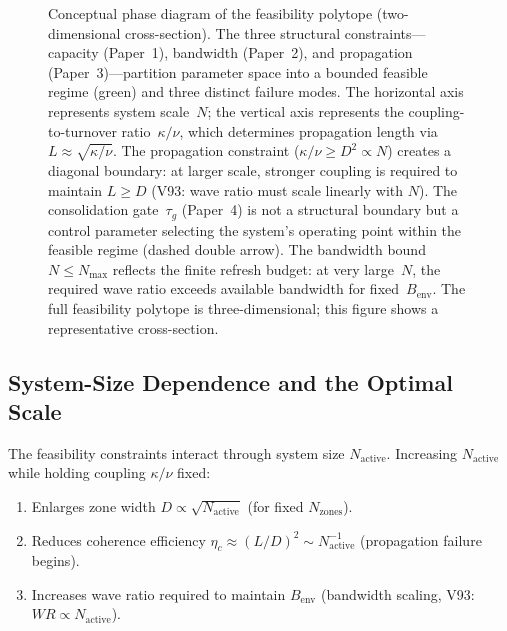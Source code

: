 \documentclass[11pt]{article}
\begin{document}
\begin{figure}[htbp]
\caption{Conceptual phase diagram of the feasibility polytope (two-dimensional cross-section).
The three structural constraints---capacity (Paper~1), bandwidth (Paper~2), and propagation (Paper~3)---partition parameter space into a bounded feasible regime (green) and three distinct failure modes.
The horizontal axis represents system scale~$N$; the vertical axis represents the coupling-to-turnover ratio~$\kappa/\nu$, which determines propagation length via $L \approx \sqrt{\kappa/\nu}$.
The propagation constraint ($\kappa/\nu \geq D^2 \propto N$) creates a diagonal boundary: at larger scale, stronger coupling is required to maintain $L \geq D$ (V93: wave ratio must scale linearly with $N$).
The consolidation gate~$\tau_g$ (Paper~4) is not a structural boundary but a control parameter selecting the system's operating point within the feasible regime (dashed double arrow).
The bandwidth bound $N \leq N_{\max}$ reflects the finite refresh budget: at very large~$N$, the required wave ratio exceeds available bandwidth for fixed~$B_{\text{env}}$.
The full feasibility polytope is three-dimensional; this figure shows a representative cross-section.}
\label{fig:feasible}
\end{figure}

\subsection{System-Size Dependence and the Optimal Scale}

The feasibility constraints interact through system size $N_{\text{active}}$.
Increasing $N_{\text{active}}$ while holding coupling $\kappa/\nu$ fixed:
\begin{enumerate}
  \item Enlarges zone width $D \propto \sqrt{N_{\text{active}}}$ (for fixed $N_{\text{zones}}$).
  \item Reduces coherence efficiency $\eta_c \approx (L/D)^2 \sim N_{\text{active}}^{-1}$ (propagation failure begins).
  \item Increases wave ratio required to maintain $B_{\text{env}}$ (bandwidth scaling, V93: $WR \propto N_{\text{active}}$).
\end{enumerate}
\end{document}
